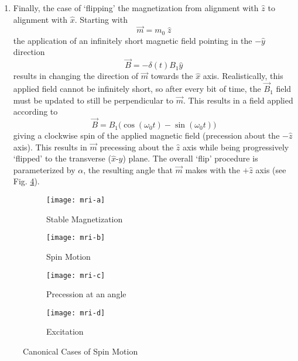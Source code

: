 \begin{enumerate}
\item Finally, the case of `flipping' the magnetization from alignment with $\hat{z}$ to alignment with $\hat{x}$. Starting with \begin{equation}
\vec{m} = m_0\; \hat{z}
\end{equation} the application of an infinitely short magnetic field pointing in the $-\hat{y}$ direction 
\begin{equation}
\vec{B} = -\delta(t)B_1\hat{y}
\end{equation}results in changing the direction of $\vec{m}$ towards the $\hat{x}$ axis. Realistically, this applied field cannot be infinitely short, so after every bit of time, the $\vec{B}_1$ field must be updated to still be perpendicular to $\vec{m}$. This results in a field applied according to
\begin{equation}
\vec{B}=B_1\big(\cos\left(\omega_0 t\right) - \sin\left(\omega_0 t\right)\big)
\end{equation}
giving a clockwise spin of the applied magnetic field (precession about the $-\hat{z}$ axis). This results in $\vec{m}$ precessing about the $\hat{z}$ axis while being progressively `flipped' to the transverse ($\hat{x}$-$\hat{y}$) plane. The overall `flip' procedure is parameterized by $\alpha$, the resulting angle that $\vec{m}$ makes with the $+\hat{z}$ axis (see Fig. \ref{fig:mri:flip}).

\end{enumerate}

\begin{figure}[h]
	\centering
	\begin{subfigure}[b]{0.22\textwidth}
		\centering
		\texttt{[image: mri-a]}
		\caption{Stable Magnetization}
		\label{fig:mri:stable}
	\end{subfigure}\hfill
	\begin{subfigure}[b]{0.22\textwidth}
		\centering
		\texttt{[image: mri-b]}
		\caption{Spin Motion}
		\label{fig:mri:precession}
	\end{subfigure}\hfill
	\begin{subfigure}[b]{0.22\textwidth}
		\centering
		\texttt{[image: mri-c]}
		\caption{Precession at an angle}
		\label{fig:mri:decay}
	\end{subfigure}\hfill
	\begin{subfigure}[b]{0.22\textwidth}
		\centering
		\texttt{[image: mri-d]}
		\caption{Excitation}
		\label{fig:mri:flip}
	\end{subfigure}
	\caption{Canonical Cases of Spin Motion}\label{fig:mri:cases}
\end{figure}

